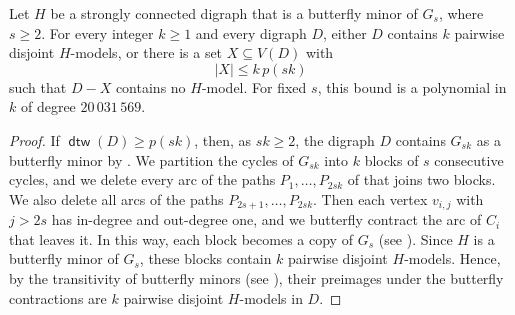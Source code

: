 \documentclass[fontsize=12pt,leading=14pt]{fullpaper}
\DeclareMathOperator{\dtw}{\mathsf{dtw}}
\begin{document}
\begin{corollary}\label{cor:strong-pattern}
  Let $H$ be a strongly connected digraph that is a butterfly minor of $G_s$, where $s\ge2$.
  For every integer $k\ge1$ and every digraph $D$, either $D$ contains $k$ pairwise disjoint $H$-models, or there is a set $X\subseteq V(D)$ with
  \[
    |X|\le k\,p(sk)
  \]
  such that $D-X$ contains no $H$-model.
  For fixed $s$, this bound is a polynomial in $k$ of degree $20\,031\,569$.
\end{corollary}

\begin{proof}
  If $\dtw(D)\ge p(sk)$, then, as $sk\ge2$, the digraph $D$ contains $G_{sk}$ as a butterfly minor by .
  We partition the cycles of $G_{sk}$ into $k$ blocks of $s$ consecutive cycles, and we delete every arc of the paths $P_1,\dots,P_{2sk}$ of  that joins two blocks.
  We also delete all arcs of the paths $P_{2s+1},\dots,P_{2sk}$.
  Then each vertex $v_{i,j}$ with $j>2s$ has in-degree and out-degree one, and we butterfly contract the arc of $C_i$ that leaves it.
  In this way, each block becomes a copy of $G_s$ (see ).
  Since $H$ is a butterfly minor of $G_s$, these blocks contain $k$ pairwise disjoint $H$-models.
  Hence, by the transitivity of butterfly minors (see ), their preimages under the butterfly contractions are $k$ pairwise disjoint $H$-models in $D$.


\end{proof}
\end{document}
